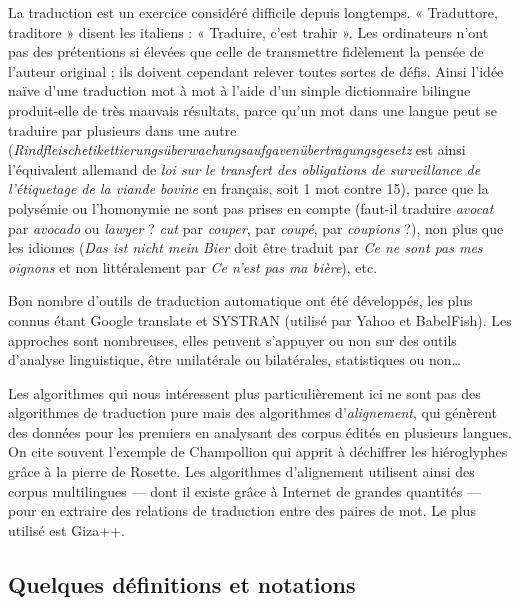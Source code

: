 \documentclass[a4paper,10pt]{article}
\newcommand{\anym}{\emph{anymalign}}
\newcommand{\guill}[1]{« #1 »}
\begin{document}
La traduction est un exercice considéré difficile depuis longtemps. \guill{Traduttore, traditore} disent les italiens : \guill{Traduire, c'est trahir}. Les ordinateurs n'ont pas des prétentions si élevées que celle de transmettre fidèlement la pensée de l'auteur original ; ils doivent cependant relever toutes sortes de défis. Ainsi l'idée naïve d'une traduction mot à mot à l'aide d'un simple dictionnaire bilingue produit-elle de très mauvais résultats, parce qu'un mot dans une langue peut se traduire par plusieurs dans une autre (\emph{Rindfleischetikettierungsüberwachungsaufgavenübertragungsgesetz} est ainsi l'équivalent allemand de \emph{loi sur le transfert des obligations de surveillance de l'étiquetage de la viande bovine} en français, soit 1 mot contre 15), parce que la polysémie ou l'homonymie ne sont pas prises en compte (faut-il traduire \emph{avocat} par \emph{avocado} ou \emph{lawyer} ? \emph{cut} par \emph{couper}, par \emph{coupé}, par \emph{coupions} ?), non plus que les idiomes (\emph{Das ist nicht mein Bier} doit être traduit par \emph{Ce ne sont pas mes oignons} et non littéralement par \emph{Ce n'est pas ma bière}), etc.

Bon nombre d'outils de traduction automatique ont été développés, les plus connus étant Google translate et SYSTRAN (utilisé par Yahoo et BabelFish). Les approches sont nombreuses, elles peuvent s'appuyer ou non sur des outils d'analyse linguistique, être unilatérale ou bilatérales, statistiques ou non\dots

Les algorithmes qui nous intéressent plus particulièrement ici ne sont pas des algorithmes de traduction pure mais des algorithmes d'\emph{alignement}, qui génèrent des données pour les premiers en analysant des corpus édités en plusieurs langues. On cite souvent l'exemple de Champollion qui apprit à déchiffrer les hiéroglyphes grâce à la pierre de Rosette. Les algorithmes d'alignement utilisent ainsi des corpus multilingues --- dont il existe grâce à Internet de grandes quantités --- pour en extraire des relations de traduction entre des paires de mot. Le plus utilisé est Giza++.





\subsection{Quelques définitions et notations}
\end{document}
